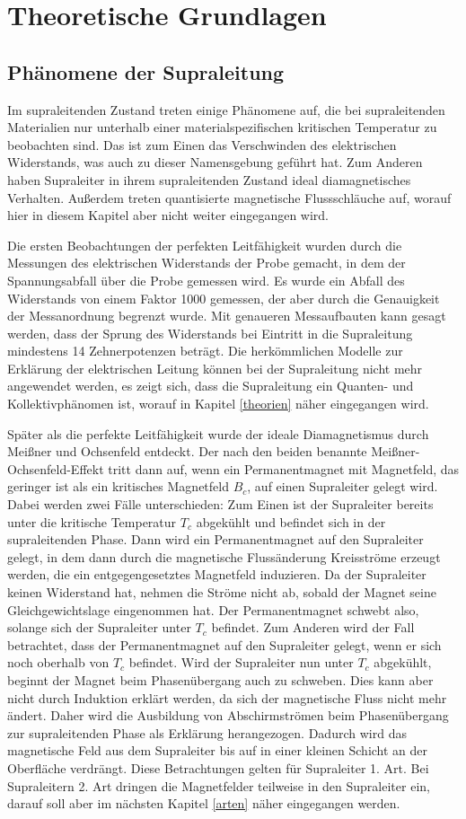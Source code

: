 \section{Theoretische Grundlagen}
\subsection{Phänomene der Supraleitung}
Im supraleitenden Zustand treten einige Phänomene auf, die bei supraleitenden Materialien nur unterhalb einer materialspezifischen kritischen Temperatur zu beobachten sind. Das ist zum Einen das Verschwinden des elektrischen Widerstands, was auch zu dieser Namensgebung geführt hat. Zum Anderen haben Supraleiter in ihrem supraleitenden Zustand ideal diamagnetisches Verhalten. Außerdem treten quantisierte magnetische Flussschläuche auf, worauf hier in diesem Kapitel aber nicht weiter eingegangen wird.

Die ersten Beobachtungen der perfekten Leitfähigkeit wurden durch die Messungen des elektrischen Widerstands der Probe gemacht, in dem der Spannungsabfall über die Probe gemessen wird. Es wurde ein Abfall des Widerstands von einem Faktor 1000 gemessen, der aber durch die Genauigkeit der Messanordnung begrenzt wurde. Mit genaueren Messaufbauten kann gesagt werden, dass der Sprung des Widerstands bei Eintritt in die Supraleitung mindestens 14 Zehnerpotenzen beträgt\cite{supraleitung}. Die herkömmlichen Modelle zur Erklärung der elektrischen Leitung können bei der Supraleitung nicht mehr angewendet werden, es zeigt sich, dass die Supraleitung ein Quanten- und Kollektivphänomen ist, worauf in Kapitel \ref{theorien} näher eingegangen wird.

Später als die perfekte Leitfähigkeit wurde der ideale Diamagnetismus durch Meißner und Ochsenfeld entdeckt. Der nach den beiden benannte Meißner-Ochsenfeld-Effekt tritt dann auf, wenn ein Permanentmagnet mit Magnetfeld, das geringer ist als ein kritisches Magnetfeld $B_c$, auf einen Supraleiter gelegt wird. Dabei werden zwei Fälle unterschieden: Zum Einen ist der Supraleiter bereits unter die kritische Temperatur $T_c$ abgekühlt und befindet sich in der supraleitenden Phase. Dann wird ein Permanentmagnet auf den Supraleiter gelegt, in dem dann durch die magnetische Flussänderung Kreisströme erzeugt werden, die ein entgegengesetztes Magnetfeld induzieren. Da der Supraleiter keinen Widerstand hat, nehmen die Ströme nicht ab, sobald der Magnet seine Gleichgewichtslage eingenommen hat. Der Permanentmagnet schwebt also, solange sich der Supraleiter unter $T_c$ befindet. Zum Anderen wird der Fall betrachtet, dass der Permanentmagnet auf den Supraleiter gelegt, wenn er sich noch oberhalb von $T_c$ befindet. Wird der Supraleiter nun unter $T_c$ abgekühlt, beginnt der Magnet beim Phasenübergang auch zu schweben. Dies kann aber nicht durch Induktion erklärt werden, da sich der magnetische Fluss nicht mehr ändert. Daher wird die Ausbildung von Abschirmströmen beim Phasenübergang zur supraleitenden Phase als Erklärung herangezogen. Dadurch wird das magnetische Feld aus dem Supraleiter bis auf in einer kleinen Schicht an der Oberfläche verdrängt. Diese Betrachtungen gelten für Supraleiter 1. Art. Bei Supraleitern 2. Art dringen die Magnetfelder teilweise in den Supraleiter ein, darauf soll aber im nächsten Kapitel \ref{arten} näher eingegangen werden.
